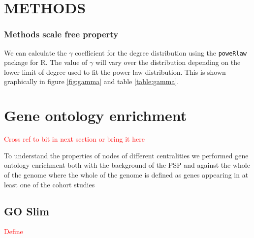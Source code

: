 






\section{METHODS}

\subsubsection{Methods scale free property}
We can calculate the $\gamma$ coefficient for the degree distribution using the \texttt{poweRlaw} package for R. The value of $\gamma$ will vary over the distribution depending on the lower limit of degree used to fit the power law distribution. This is shown graphically in figure \ref{fig:gamma} and table \ref{table:gamma}.


\section{Gene ontology enrichment}
\textcolor{red}{Cross ref to bit in next section or bring it here}

To understand the properties of nodes of different centralities we performed gene ontology enrichment both with the background of the PSP and against the whole of the genome where the whole of the genome is defined as genes appearing in at least one of the cohort studies 

\subsection{GO Slim}
\textcolor{red}{Define}

